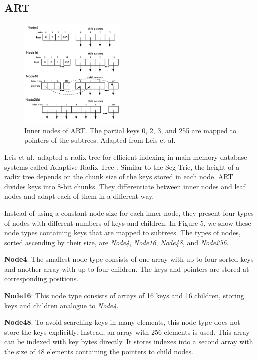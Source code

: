 \documentclass[runningheads,a4paper]{llncs}
\begin{document}
\subsection{ART}\label{SCM}
\begin{figure} \vspace{-47pt}
	\includegraphics[width=0.45\textwidth]{ART} \vspace{-27pt}
	\caption{Inner nodes of ART. The partial keys 0, 2, 3, and 255 are mapped to pointers of the subtrees. Adapted from Leis et al.\ \cite{leis2013adaptive}}
	\label{art}
\end{figure}
Leis et al.\ adapted a radix tree for efficient indexing in main-memory database systems called Adaptive Radix Tree \cite{leis2013adaptive}. Similar to the Seg-Trie, the height of a radix tree depends on the chunk size of the keys stored in each node. ART divides keys into 8-bit chunks. They differentiate between inner nodes and leaf nodes and adapt each of them in a different way.

Instead of using a constant node size for each inner node, they present four types of nodes with different numbers of keys and children. In Figure 5, we show these node types containing keys that are mapped to subtrees. The types of nodes, sorted ascending by their size, are \emph{Node4}, \emph{Node16}, \emph{Node48}, and \emph{Node256}.  

\textbf{Node4}: The smallest node type consists of one array with up to four sorted keys and another array with up to four children. The keys and pointers are stored at corresponding positions.

\textbf{Node16}: This node type consists of arrays of 16 keys and 16 children, storing keys and children analogue to \emph{Node4}.

\textbf{Node48}: To avoid searching keys in many elements, this node type does not store the keys explicitly. Instead, an array with 256 elements is used. This array can be indexed with key bytes directly. It stores indexes into a second array with the size of 48 elements containing the pointers to child nodes.
\end{document}
